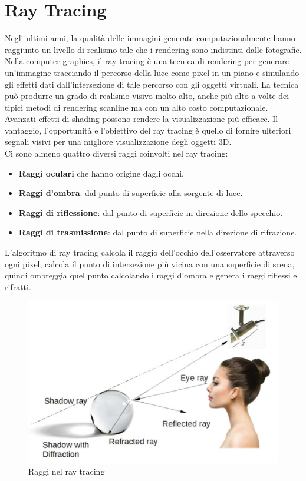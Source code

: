 \documentclass[9pt,a4paper,twoside]{tau}
\begin{document}
\section{Ray Tracing}
Negli ultimi anni, la qualità delle immagini generate computazionalmente hanno raggiunto un livello di realismo tale che i rendering sono indistinti dalle fotografie.\\
Nella computer graphics, il ray tracing è una tecnica di rendering per generare un'immagine tracciando il percorso della luce come pixel in un piano e simulando gli effetti dati dall'intersezione di tale percorso con gli oggetti virtuali. La tecnica può produrre un grado di realismo visivo molto alto, anche più alto a volte dei tipici metodi di rendering scanline ma con un alto costo computazionale. \\
Avanzati effetti di shading possono rendere la visualizzazione più efficace. Il vantaggio, l'opportunità e l'obiettivo del ray tracing è quello di fornire ulteriori segnali visivi per una migliore visualizzazione degli oggetti 3D.\\
Ci sono almeno quattro diversi raggi coinvolti nel ray tracing:
\begin{itemize}
	\item \textbf{Raggi oculari} che hanno origine dagli occhi.
	\item \textbf{Raggi d'ombra}: dal punto di superficie alla sorgente di luce.
	\item \textbf{Raggi di riflessione}: dal punto di superficie in direzione dello specchio.
	\item \textbf{Raggi di trasmissione}: dal punto di superficie nella direzione di rifrazione.
\end{itemize}
L'algoritmo di ray tracing calcola il raggio dell'occhio dell'osservatore attraverso ogni pixel, calcola il punto di intersezione più vicina con una superficie di scena, quindi ombreggia quel punto calcolando i raggi d'ombra e genera i raggi riflessi e rifratti.
\begin{figure}[H]
    \centering
    \includegraphics[width=0.7\columnwidth]{Figures/11.png}
    \caption{Raggi nel ray tracing}
    \label{fig:figure}
\end{figure}
\end{document}
